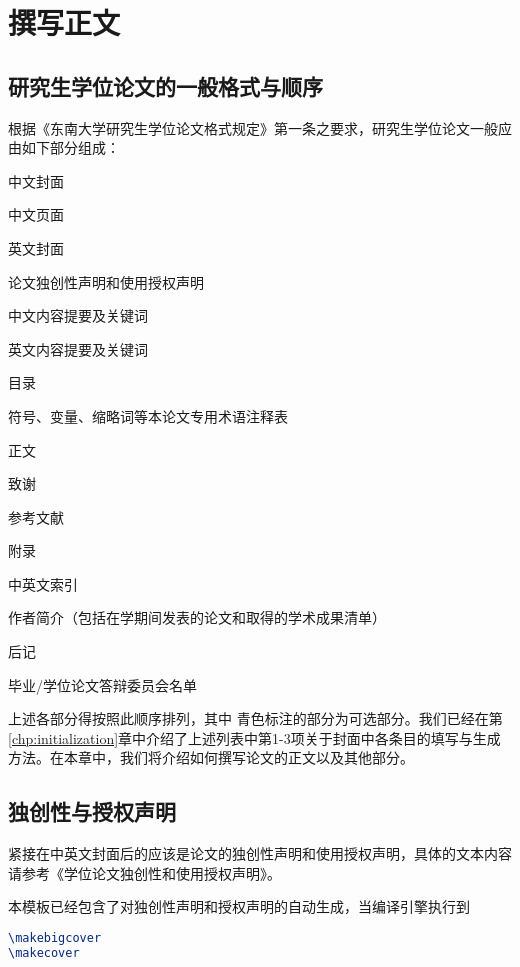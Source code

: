 \chapter{撰写正文}

\section{研究生学位论文的一般格式与顺序}

根据《东南大学研究生学位论文格式规定》\cite{seugs2023rule}第一条之要求，研究生学位论文一般应由如下部分组成：

\begin{enumerate}
  \item 中文封面
  \item 中文页面
  \item 英文封面
  \item 论文独创性声明和使用授权声明
  \item 中文内容提要及关键词
  \item 英文内容提要及关键词
  \item 目录
  {\color{cyan} \item 符号、变量、缩略词等本论文专用术语注释表}
  \item 正文
  \item 致谢
  \item 参考文献
  {\color{cyan} \item 附录
  \item 中英文索引
  \item 作者简介（包括在学期间发表的论文和取得的学术成果清单）
  \item 后记
  \item 毕业/学位论文答辩委员会名单}
\end{enumerate}
上述各部分得按照此顺序排列，其中{\color{cyan} 青色}标注的部分为可选部分。我们已经在第\ref{chp:initialization}章中介绍了上述列表中第1-3项关于封面中各条目的填写与生成方法。在本章中，我们将介绍如何撰写论文的正文以及其他部分。

\section{独创性与授权声明}

紧接在中英文封面后的应该是论文的独创性声明和使用授权声明，具体的文本内容请参考《学位论文独创性和使用授权声明》\cite{seugs2023license}。

本模板已经包含了对独创性声明和授权声明的自动生成，当编译引擎执行到

\begin{tcolorbox}
\begin{lstlisting}[language=TeX]
\makebigcover
\makecover
\end{lstlisting}
\end{tcolorbox}

